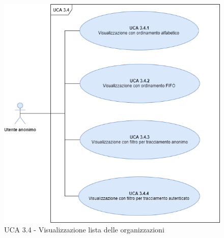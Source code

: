 \begin{figure}[h]
	\centering	
	\includegraphics[scale=0.45, center]{Sezioni/UseCase/Immagini/UCA3.4.png}
	\caption{UCA 3.4 - Visualizzazione lista delle organizzazioni}
\end{figure}

